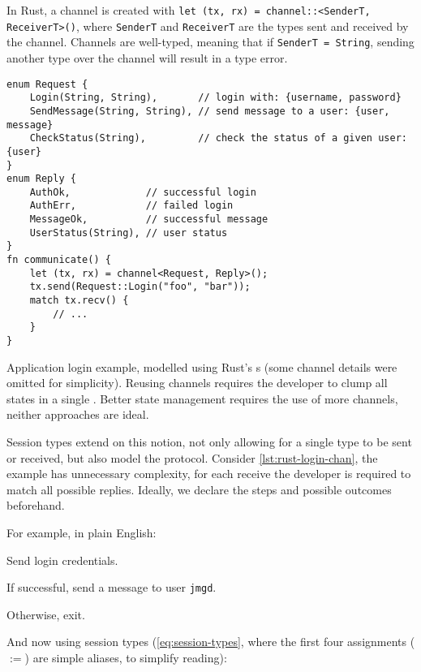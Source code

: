 In Rust, a channel is created with \texttt{let (tx, rx) = channel::<SenderT, ReceiverT>()},
where \texttt{SenderT} and \texttt{ReceiverT} are the types sent and received by the channel.
Channels are well-typed, meaning that if \texttt{SenderT = String},
sending another type over the channel will result in a type error.

\begin{listing}
    \centering
    \begin{verbatim}
enum Request {
    Login(String, String),       // login with: {username, password}
    SendMessage(String, String), // send message to a user: {user, message}
    CheckStatus(String),         // check the status of a given user: {user}
}
enum Reply {
    AuthOk,             // successful login
    AuthErr,            // failed login
    MessageOk,          // successful message
    UserStatus(String), // user status
}
fn communicate() {
    let (tx, rx) = channel<Request, Reply>();
    tx.send(Request::Login("foo", "bar"));
    match tx.recv() {
        // ...
    }
}
    \end{verbatim}
    \caption{
        Application login example, modelled using Rust's s
        (some channel details were omitted for simplicity).
        Reusing channels requires the developer to clump all states in a single .
        Better state management requires the use of more channels, neither approaches are ideal.
    }
    \label{lst:rust-login-chan}
\end{listing}

Session types extend on this notion, not only allowing for a single type to be sent or received,
but also model the protocol.
Consider \autoref{lst:rust-login-chan}, the example has unnecessary complexity,
for each receive the developer is required to match all possible replies.
Ideally, we declare the steps and possible outcomes beforehand.

For example, in plain English:
\begin{compactenum}
    \item Send login credentials.
    \item If successful, send a message to user \texttt{jmgd}.
    \item Otherwise, exit.
\end{compactenum}

And now using session types (\autoref{eq:session-types},
where the first four assignments ($:=$) are simple aliases, to simplify reading):

